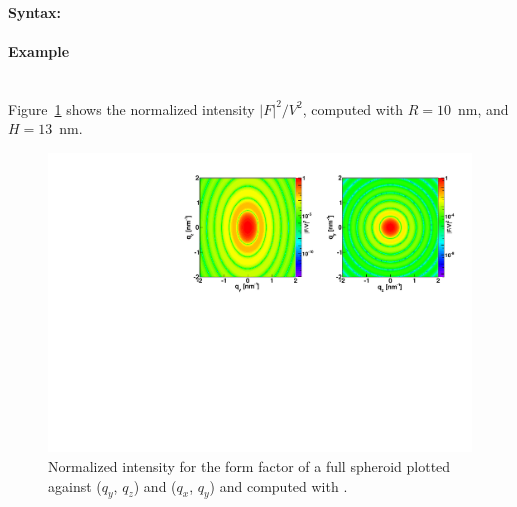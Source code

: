 \paragraph{Syntax:} 
\newpage

\paragraph{Example}\mbox{}\\
Figure~\ref{fig:FFfspheroidEx} shows the normalized intensity
$|F|^2/V^2$, computed with $R=10$~nm, and $H=13$~nm.
\begin{figure}[ht]
\begin{center}
\includegraphics[angle=-90,width=\textwidth]{Figures/ff/figfffspheroid.pdf}
\end{center}
\caption{Normalized intensity for the form factor of a full spheroid plotted against ($q_y$, $q_z$) and ($q_x$, $q_y$) and
  computed with .}
\label{fig:FFfspheroidEx}
\end{figure}



